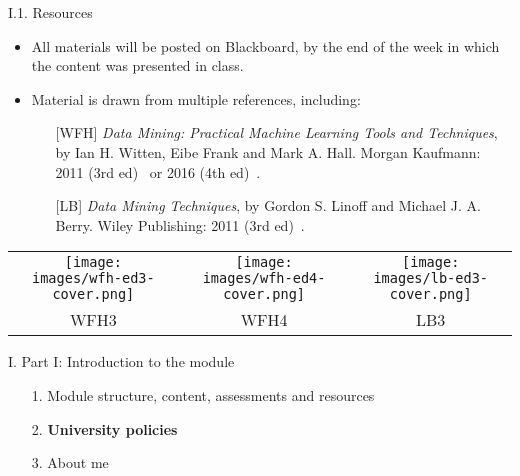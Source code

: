 \documentclass[handout]{beamer}
\newcommand{\stronger}[1]{\textbf{\color{purple} #1}}
\begin{document}
\begin{frame}{I.1. Resources}
\begin{itemize}
\item All materials will be posted on Blackboard, by the end of the week in which the content was presented in class.
\item Material is drawn from multiple references, including:
	{\small
    \begin{itemize}
    \item[{[WFH]}] \emph{Data Mining: Practical Machine Learning Tools and Techniques}, by Ian H. Witten, Eibe Frank and Mark A. Hall. Morgan Kaufmann: 2011 (3rd ed)~\nocite{WFH3:2011} or 2016 (4th ed)~\nocite{WFH4:2016}.
    \item[{[LB]}] \emph{Data Mining Techniques}, by Gordon S. Linoff and Michael J. A. Berry. Wiley Publishing: 2011 (3rd ed)~\nocite{LB3:2011}.
    \end{itemize}}
\end{itemize}
\begin{center}
{\footnotesize
\begin{tabular}{ccc}
\texttt{[image: images/wfh-ed3-cover.png]} & 
\texttt{[image: images/wfh-ed4-cover.png]} &
\texttt{[image: images/lb-ed3-cover.png]} \\
WFH3 & WFH4 & LB3 \\
\end{tabular}
}
\end{center}
\end{frame}
\begin{frame}{I. Part I: Introduction to the module}
\begin{itemize}
\item[1.] Module structure, content, assessments and resources
\item[2.] \stronger{University policies}
\item[3.] About me

\end{itemize}
\end{frame}
\end{document}
